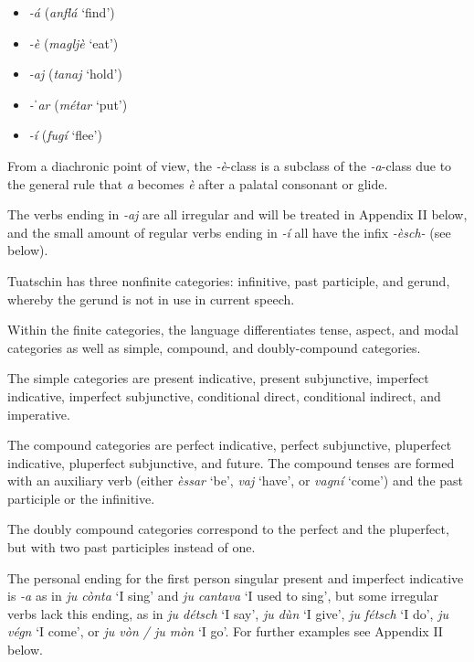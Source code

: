 \begin{itemize}

\item \textit{-á} (\textit{anflá} `find')
\item \textit{-è} (\textit{magljè} `eat')
\item  \textit{-aj} (\textit{tanaj} `hold')
\item \textit{-ˈar} (\textit{métar} `put')
\item \textit{-í} (\textit{fugí} `flee')
\end{itemize}

From a diachronic point of view, the \textit{-è}-class is a subclass of the \textit{-a}-class due to the general rule that \textit{a} becomes \textit{è} after a palatal consonant or glide.

The verbs ending in \textit{-aj} are all irregular and will be treated in Appendix II below, and the small amount of regular verbs ending in \textit{-í} all have the infix \textit{-èsch-} (see  below).

Tuatschin has three nonfinite categories: infinitive, past participle, and gerund, whereby the gerund is not in use in current speech.

Within the finite categories, the language differentiates tense, aspect, and modal categories as well as simple,  compound, and doubly-compound categories.

The simple categories are present indicative, present subjunctive, imperfect indicative, imperfect subjunctive, conditional direct, conditional indirect, and imperative.

The compound categories are perfect indicative, perfect subjunctive, pluperfect indicative,  pluperfect subjunctive, and future. The compound tenses are formed with an auxiliary verb (either \textit{èssar} `be', \textit{vaj} `have', or \textit{vagní} `come') and the past participle or the infinitive. 

The doubly compound categories correspond to the perfect and the pluperfect, but with two past participles instead of one.

The personal ending for the first person singular present and imperfect indicative is \textit{-a} as in \textit{ju cònta} `I sing' and \textit{ju cantava} `I used to sing', but some irregular verbs lack this ending, as in  \textit{ju détsch} `I say', \textit{ju dùn} `I give', \textit{ju fétsch} `I do', \textit{ju végn} `I come', or \textit{ju vòn / ju mòn} `I go'. For further examples see Appendix II below.

